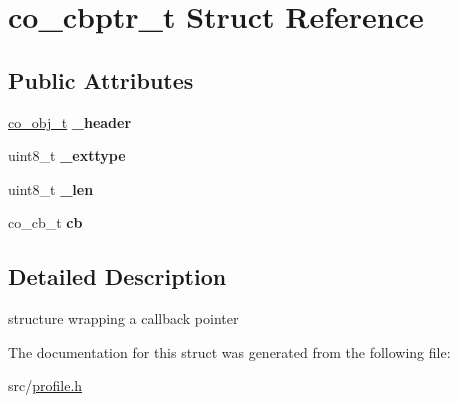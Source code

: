 \hypertarget{structco__cbptr__t}{\section{co\-\_\-cbptr\-\_\-t Struct Reference}
\label{structco__cbptr__t}
}
\subsection*{Public Attributes}
\begin{DoxyCompactItemize}
\item 
\hypertarget{structco__cbptr__t_a9ded517d6461d4c829b450625b890c49}{\hyperlink{structco__obj__t}{co\-\_\-obj\-\_\-t} {\bfseries \-\_\-header}}\label{structco__cbptr__t_a9ded517d6461d4c829b450625b890c49}

\item 
\hypertarget{structco__cbptr__t_a3718779cdc08d9896e730cbd5048a4a2}{uint8\-\_\-t {\bfseries \-\_\-exttype}}\label{structco__cbptr__t_a3718779cdc08d9896e730cbd5048a4a2}

\item 
\hypertarget{structco__cbptr__t_a769aa2644568b8dfe3d8ccc8b3e3d1d9}{uint8\-\_\-t {\bfseries \-\_\-len}}\label{structco__cbptr__t_a769aa2644568b8dfe3d8ccc8b3e3d1d9}

\item 
\hypertarget{structco__cbptr__t_aff2d976115dd1c8cacdacc06df55f53c}{co\-\_\-cb\-\_\-t {\bfseries cb}}\label{structco__cbptr__t_aff2d976115dd1c8cacdacc06df55f53c}

\end{DoxyCompactItemize}


\subsection{Detailed Description}
structure wrapping a callback pointer 

The documentation for this struct was generated from the following file\-:\begin{DoxyCompactItemize}
\item 
src/\hyperlink{profile_8h}{profile.\-h}\end{DoxyCompactItemize}
